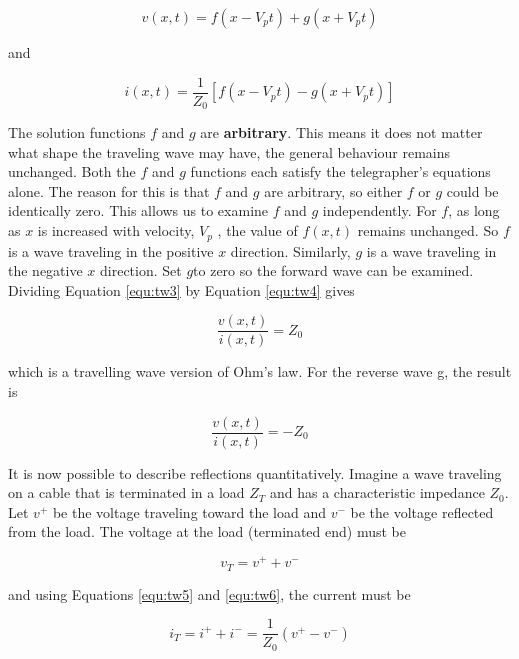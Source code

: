 \begin{equation}
v(x,t)=f(x-V_pt)+g(x+V_pt)
\label{equ:tw3}
\end{equation}

\noindent and

\begin{equation}
i(x,t)=\dfrac{1}{Z_0}\left[f(x-V_pt)-g(x+V_pt)\right]
\label{equ:tw4}
\end{equation}

The solution functions $f$ and $g$ are {\bf arbitrary}. This means it does not matter what shape the traveling wave may have, the general behaviour remains unchanged.  Both the $f$ and $g$ functions each satisfy the telegrapher's equations alone. The reason for this is that $f$ and $g$ are arbitrary, so either $f$ or $g$ could be identically zero. This allows us to examine $f$ and $g$ independently. For $f$, as long as $x$ is increased with velocity, $V_p$ , the value of $f(x,t)$ remains unchanged. So $f$ is a wave traveling in the positive $x$ direction. Similarly, $g$ is a wave traveling in the negative $x$ direction. Set $g $to zero so the forward wave can be examined. Dividing Equation \ref{equ:tw3} by Equation \ref{equ:tw4} gives

\begin{equation}
\dfrac{v(x,t)}{i(x,t)}=Z_0
\label{equ:tw5}
\end{equation}

\noindent which is a travelling wave version of Ohm's law. For the reverse wave g, the result is

\begin{equation}
\dfrac{v(x,t)}{i(x,t)}=-Z_0
\label{equ:tw6}
\end{equation}

It is now possible to describe reflections quantitatively. Imagine a wave traveling on a cable that is terminated in a load $Z_T$ and has a characteristic impedance $Z_0$. Let $v^+$ be the voltage traveling toward the load and $v^-$ be the voltage reflected from the load. The voltage at the load (terminated end) must be

\begin{equation}
v_T=v^++v^-
\label{equ:tw7}
\end{equation}

\noindent and using Equations \ref{equ:tw5} and \ref{equ:tw6}, the current must be

\begin{equation}
i_T=i^++i^-=\dfrac{1}{Z_0}\left(v^+-v^-\right)
\label{equ:tw8}
\end{equation}

